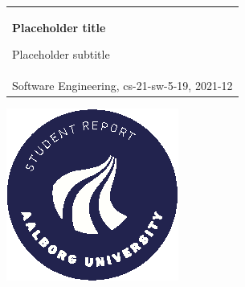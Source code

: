 %
\begin{titlepage}
\vspace*{\fill}
  \addtolength{\hoffset}{0.5\evensidemargin-0.5\oddsidemargin} %
  \noindent%
  {\color{white}\colorbox{aaublue}{\begin{tabular}{@{}p{\textwidth}@{}}
    \begin{center}
    \Huge{\textbf{
      Placeholder title%
    }}
    \end{center}
    \begin{center}
      \Large{
        Placeholder subtitle%
      }
    \end{center}
    \vspace{0.2cm}
   \begin{center}
    {\Large
      Christian Bager Bach Houmann, Daniel Overvad Nykjær, Ivik Lau Dalgas Hostrup, Marco Klaustrup Justesen, Patrick Frostholm Østergaard, Rasmus Høyer Hansen %
    }\\
    \vspace{0.2cm}
    {\large
      Software Engineering, cs-21-sw-5-19, 2021-12%
    }
   \end{center}
   \vspace{0.2cm}
   \begin{center}
    {\Large
      5th semester
    }
   \end{center}
  \end{tabular}}}
  \vfill
  \begin{center}
    \includegraphics[width=0.2\paperwidth]{AAUgraphics/aau_logo_circle_en}%
  \end{center}
\end{titlepage}
\clearpage
